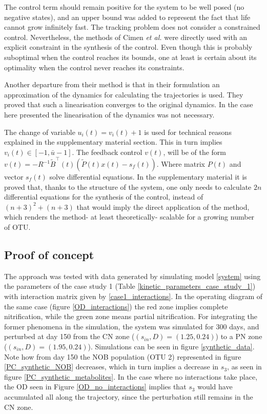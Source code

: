 \documentclass[processes,article,submit,moreauthors,pdftex]{Definitions/mdpi}
\begin{document}
The control term should remain positive for the system to be well posed (no negative states), and an upper bound was added to represent the fact that life cannot grow infinitely fast. The tracking problem does not consider a constrained control. Nevertheless, the methods of Cimen \textit{et al.} \cite{Cimen2004} were directly used with an explicit constraint in the synthesis of the control. Even though this is probably suboptimal when the control reaches its bounds, one at least is certain about its optimality when the control never reaches its constraints.

Another departure from their method is that in their formulation an approximation of the dynamics for calculating the trajectories is used. They proved that such a linearisation converges to the original dynamics. In the case here presented the linearisation of the dynamics was not necessary.

The change of variable $u_i(t) = v_i(t) + 1$ is used for technical reasons explained in the supplementary material section. This in turn implies $v_i(t) \in [-1,\bar{u}-1]$. The feedback control $v(t)$, will be of the form $v(t) = -R^{-1}\tilde{B}^ \top(t)\left(\tilde{P}(t)x(t)-s_f(t)\right)$. Where matrix $P(t)$ and vector $s_f(t)$ solve differential equations. In the supplementary material it is proved that, thanks to the structure of the system, one only needs to calculate $2n$ differential equations for the synthesis of the control, instead of $(n+3)^2 + (n+3)$ that would imply the direct application of the method, which renders the method- at least theoretically- scalable for a growing number of OTU.

\subsection{Proof of concept}

The approach was tested with data generated by simulating model \eqref{system} using the parameters of the case study 1 (Table \ref{kinetic_parameters_case_study_1}) with interaction matrix given by \eqref{case1_interactions}. In the operating diagram of the same case (figure \eqref{OD_interactions}) the red zone implies complete nitrification, while the green zone means partial nitrification. For integrating the former phenomena in the simulation, the system was simulated for 300 days, and perturbed at day 150 from the CN zone ($(s_{in},D) = (1.25,0.24)$) to a PN zone ($(s_{in},D) = (1.95,0.24)$). Simulations can be seen in figure \ref{synthetic_data}. Note how from day 150 the NOB population (OTU 2) represented in figure \eqref{PC_synthetic_NOB} decreases, which in turn implies a decrease in $s_3$, as seen in figure \eqref{PC_synthetic_metabolites}. In the case where no interactions take place, the OD seen in Figure \ref{OD_no_interactions} implies that $s_3$ would have accumulated all along the trajectory, since the perturbation still remains in the CN zone.
\end{document}
